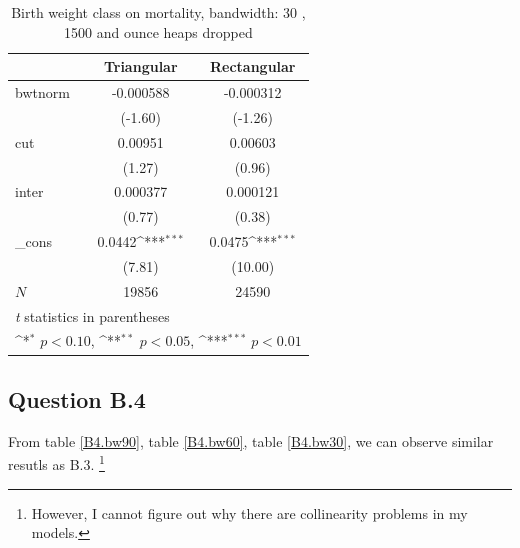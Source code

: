\documentclass[a4paper,11pt]{article}
\begin{document}
\begin{table}[htbp]\centering
\def\sym#1{\ifmmode^{#1}\else\(^{#1}\)\fi}
\caption{Birth weight class on mortality, bandwidth: 30 , 1500 and ounce heaps dropped}
\label{B3.bw30}
\begin{tabular}{l*{2}{c}}
\hline\hline
            &\multicolumn{1}{c}{Triangular}&\multicolumn{1}{c}{Rectangular}\\
\hline
bwtnorm     &   -0.000588         &   -0.000312         \\
            &     (-1.60)         &     (-1.26)         \\
[1em]
cut         &     0.00951         &     0.00603         \\
            &      (1.27)         &      (0.96)         \\
[1em]
inter       &    0.000377         &    0.000121         \\
            &      (0.77)         &      (0.38)         \\
[1em]
\_cons      &      0.0442\sym{***}&      0.0475\sym{***}\\
            &      (7.81)         &     (10.00)         \\
\hline
\(N\)       &       19856         &       24590         \\
\hline\hline
\multicolumn{3}{l}{\footnotesize \textit{t} statistics in parentheses}\\
\multicolumn{3}{l}{\footnotesize \sym{*} \(p<0.10\), \sym{**} \(p<0.05\), \sym{***} \(p<0.01\)}\\
\end{tabular}
\end{table}


\subsection*{Question B.4}

From table \ref{B4.bw90}, table \ref{B4.bw60}, table \ref{B4.bw30}, we can observe similar resutls as B.3.
\footnote{However, I cannot figure out why there are collinearity problems in my models.}
\end{document}

